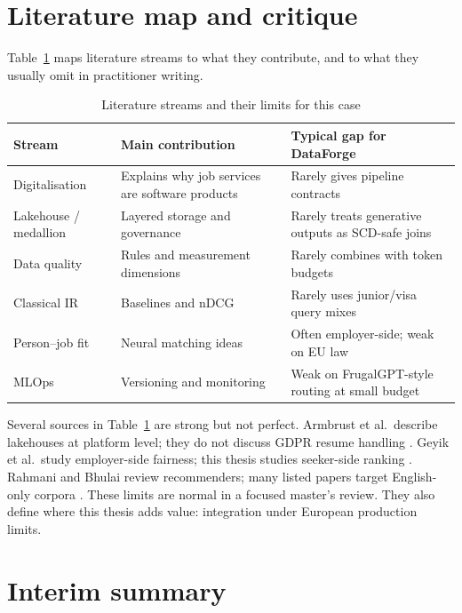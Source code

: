 \section{Literature map and critique}
\label{sec:lit-critique}

Table~\ref{tab:lit-map} maps literature streams to what they contribute, and to what they usually omit in practitioner writing.

\begin{table}[ht]
\centering
\caption{Literature streams and their limits for this case}
\label{tab:lit-map}
\begin{tabularx}{\textwidth}{@{}lXX@{}}
\toprule
\textbf{Stream} & \textbf{Main contribution} & \textbf{Typical gap for DataForge} \\
\midrule
Digitalisation & Explains why job services are software products & Rarely gives pipeline contracts \\
Lakehouse / medallion & Layered storage and governance & Rarely treats generative outputs as SCD-safe joins \\
Data quality & Rules and measurement dimensions & Rarely combines with token budgets \\
Classical IR & Baselines and nDCG & Rarely uses junior/visa query mixes \\
Person--job fit & Neural matching ideas & Often employer-side; weak on EU law \\
MLOps & Versioning and monitoring & Weak on FrugalGPT-style routing at small budget \\
\bottomrule
\end{tabularx}
\end{table}

Several sources in Table~\ref{tab:lit-map} are strong but not perfect. Armbrust et al.\ describe lakehouses at platform level; they do not discuss GDPR resume handling . Geyik et al.\ study employer-side fairness; this thesis studies seeker-side ranking . Rahmani and Bhulai review recommenders; many listed papers target English-only corpora . These limits are normal in a focused master's review. They also define where this thesis adds value: integration under European production limits.

\section{Interim summary}
\label{sec:interim1}

